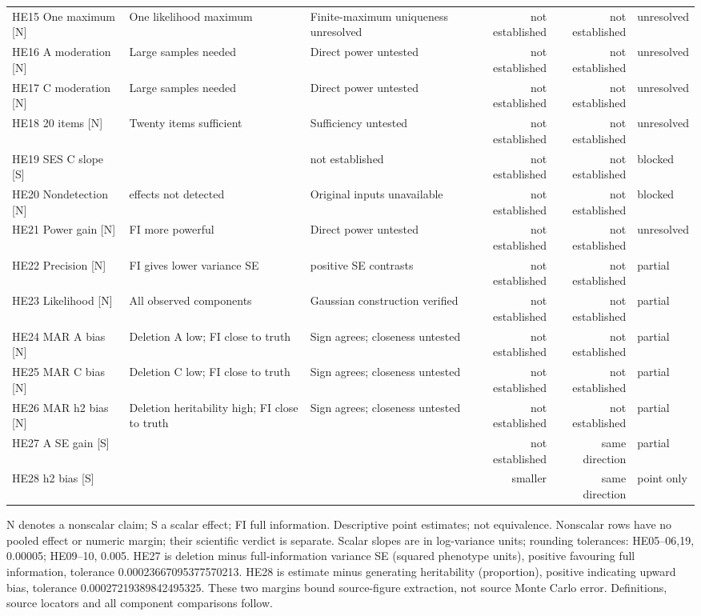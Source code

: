 \documentclass[11pt]{article}
\begin{document}
{\begin{tabular}{@{}>{\raggedright\arraybackslash}p{95pt}>{\raggedright\arraybackslash}p{105pt}>{\raggedright\arraybackslash}p{105pt}rrl@{}}
HE15 One maximum [N] & One likelihood maximum & Finite-maximum uniqueness unresolved & not established & not established & unresolved\\
HE16 A moderation [N] & Large samples needed & Direct power untested & not established & not established & unresolved\\
HE17 C moderation [N] & Large samples needed & Direct power untested & not established & not established & unresolved\\
HE18 20 items [N] & Twenty items sufficient & Sufficiency untested & not established & not established & unresolved\\
HE19 SES C slope [S] & -3.0777 & not established & not established & not established & blocked\\
HE20 Nondetection [N] & 13 effects not detected & Original inputs unavailable & not established & not established & blocked\\
HE21 Power gain [N] & FI more powerful & Direct power untested & not established & not established & unresolved\\
HE22 Precision [N] & FI gives lower variance SE & 108 positive SE contrasts & not established & not established & partial\\
HE23 Likelihood [N] & All observed components & Gaussian construction verified & not established & not established & partial\\
HE24 MAR A bias [N] & Deletion A low; FI close to truth & Sign agrees; closeness untested & not established & not established & partial\\
HE25 MAR C bias [N] & Deletion C low; FI close to truth & Sign agrees; closeness untested & not established & not established & partial\\
HE26 MAR h2 bias [N] & Deletion heritability high; FI close to truth & Sign agrees; closeness untested & not established & not established & partial\\
HE27 A SE gain [S] & 0.00106356 & 0.00150235 & not established & same direction & partial\\
HE28 h2 bias [S] & 0.03315402 & 0.03118039 & smaller & same direction & point only\\
\bottomrule\end{tabular}
\par\vspace{2pt}\noindent N denotes a nonscalar claim; S a scalar effect; FI full information. Descriptive point estimates; not equivalence. Nonscalar rows have no pooled effect or numeric margin; their scientific verdict is separate. Scalar slopes are in log-variance units; rounding tolerances: HE05--06,19, 0.00005; HE09--10, 0.005. HE27 is deletion minus full-information variance SE (squared phenotype units), positive favouring full information, tolerance 0.00023667095377570213. HE28 is estimate minus generating heritability (proportion), positive indicating upward bias, tolerance 0.00027219389842495325. These two margins bound source-figure extraction, not source Monte Carlo error. Definitions, source locators and all component comparisons follow.
}
\newpage
\end{document}
